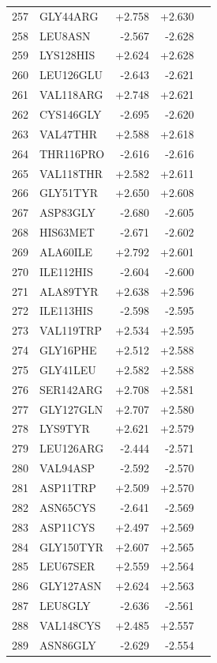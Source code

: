 \begin{longtable}{r l r r c}
257 & GLY44ARG & +2.758 & +2.630 &  \\
258 & LEU8ASN & -2.567 & -2.628 &  \\
259 & LYS128HIS & +2.624 & +2.628 &  \\
260 & LEU126GLU & -2.643 & -2.621 &  \\
261 & VAL118ARG & +2.748 & +2.621 &  \\
262 & CYS146GLY & -2.695 & -2.620 &  \\
263 & VAL47THR & +2.588 & +2.618 &  \\
264 & THR116PRO & -2.616 & -2.616 &  \\
265 & VAL118THR & +2.582 & +2.611 &  \\
266 & GLY51TYR & +2.650 & +2.608 &  \\
267 & ASP83GLY & -2.680 & -2.605 &  \\
268 & HIS63MET & -2.671 & -2.602 &  \\
269 & ALA60ILE & +2.792 & +2.601 &  \\
270 & ILE112HIS & -2.604 & -2.600 &  \\
271 & ALA89TYR & +2.638 & +2.596 &  \\
272 & ILE113HIS & -2.598 & -2.595 &  \\
273 & VAL119TRP & +2.534 & +2.595 &  \\
274 & GLY16PHE & +2.512 & +2.588 &  \\
275 & GLY41LEU & +2.582 & +2.588 &  \\
276 & SER142ARG & +2.708 & +2.581 &  \\
277 & GLY127GLN & +2.707 & +2.580 &  \\
278 & LYS9TYR & +2.621 & +2.579 &  \\
279 & LEU126ARG & -2.444 & -2.571 &  \\
280 & VAL94ASP & -2.592 & -2.570 &  \\
281 & ASP11TRP & +2.509 & +2.570 &  \\
282 & ASN65CYS & -2.641 & -2.569 &  \\
283 & ASP11CYS & +2.497 & +2.569 &  \\
284 & GLY150TYR & +2.607 & +2.565 &  \\
285 & LEU67SER & +2.559 & +2.564 &  \\
286 & GLY127ASN & +2.624 & +2.563 &  \\
287 & LEU8GLY & -2.636 & -2.561 &  \\
288 & VAL148CYS & +2.485 & +2.557 &  \\
289 & ASN86GLY & -2.629 & -2.554 &  \\

\end{longtable}
